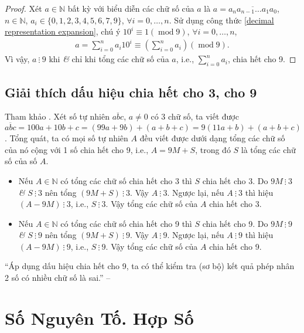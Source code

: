 \documentclass[oneside]{book}
\numberwithin{equation}{section}
\begin{document}
\begin{proof}[Proof]
	Xét $a\in\mathbb{N}$ bất kỳ với biểu diễn các chữ số của $a$ là $a = \overline{a_na_{n-1}\ldots a_1a_0}$, $n\in\mathbb{N}$, $a_i\in\{0,1,2,3,4,5,6,7,9\}$, $\forall i = 0,\ldots,n$. Sử dụng công thức \eqref{decimal representation expansion}, chú ý $10^i\equiv 1(\operatorname{mod} 9)$, $\forall i = 0,\ldots,n$,
	\begin{align*}
		a = \sum_{i=0}^n a_i10^i\equiv\left(\sum_{i=0}^n a_i\right)(\operatorname{mod} 9).
	\end{align*}
	Vì vậy, $a\ \vdots\ 9$ khi \textit{\&} chỉ khi tổng các chữ số của $a$, i.e., $\sum_{i=0}^n a_i$, chia hết cho 9.
\end{proof}

\subsection{Giải thích dấu hiệu chia hết cho 3, cho 9}
Tham khảo \cite[p. 40]{Thai_Anh_Dat_Ha_Loan_Nam_Quang_Toan_6_tap_1}. Xét số tự nhiên $\overline{abc}$, $a\ne 0$ có 3 chữ số, ta viết được $\overline{abc} = 100a + 10b + c = (99a + 9b) + (a + b + c) = 9(11a + b) + (a + b + c)$. Tổng quát, ta có mọi số tự nhiên $A$ đều viết được dưới dạng tổng các chữ số của nó cộng với 1 số chia hết cho 9, i.e., $A = 9M + S$, trong đó $S$ là tổng các chữ số của số $A$.
\begin{itemize}
	\item Nếu $A\in\mathbb{N}$ có tổng các chữ số chia hết cho 3 thì $S$ chia hết cho 3. Do $9M\ \vdots\ 3$ \textit{\&} $S\ \vdots\ 3$ nên tổng $(9M + S)\ \vdots\ 3$. Vậy $A\ \vdots\ 3$. Ngược lại, nếu $A\ \vdots\ 3$ thì hiệu $(A - 9M)\ \vdots\ 3$, i.e., $S\ \vdots\ 3$. Vậy tổng các chữ số của $A$ chia hết cho 3.
	\item Nếu $A\in\mathbb{N}$ có tổng các chữ số chia hết cho 9 thì $S$ chia hết cho 9. Do $9M\ \vdots\ 9$ \textit{\&} $S\ \vdots\ 9$ nên tổng $(9M + S)\ \vdots\ 9$. Vậy $A\ \vdots\ 9$. Ngược lại, nếu $A\ \vdots\ 9$  thì hiệu $(A - 9M)\ \vdots\ 9$, i.e., $S\ \vdots\ 9$. Vậy tổng các chữ số của $A$ chia hết cho 9.
\end{itemize}
``Áp dụng dấu hiệu chia hết cho 9, ta có thể kiểm tra (sơ bộ) kết quả phép nhân 2 số có nhiều chữ số là sai.'' -- \cite[p. 40]{Thai_Anh_Dat_Ha_Loan_Nam_Quang_Toan_6_tap_1}

\section{Số Nguyên Tố. Hợp Số}
\end{document}
